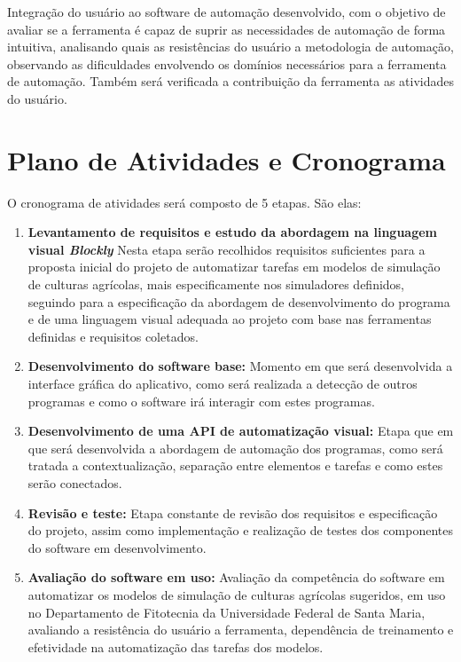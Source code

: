\documentclass[12pt]{article}
\begin{document}
    Integração do usuário ao software de automação desenvolvido, com o objetivo de avaliar se a ferramenta é capaz de suprir as necessidades de automação de forma intuitiva, analisando quais as resistências do usuário a metodologia de automação, observando as dificuldades envolvendo os domínios necessários para a ferramenta de automação. Também será verificada a contribuição da ferramenta as atividades do usuário. 

	\section{Plano de Atividades e Cronograma}
	
	O cronograma de atividades será composto de 5 etapas. São elas:
	
	\begin{enumerate}
		\item \label{activity:requisitos} \textbf{Levantamento de requisitos e estudo da abordagem na linguagem visual \emph{Blockly}}
		Nesta etapa serão recolhidos requisitos suficientes para a proposta inicial do projeto de automatizar tarefas em modelos de simulação de culturas agrícolas, mais especificamente nos simuladores definidos, seguindo para a especificação da abordagem de desenvolvimento do programa e de uma linguagem visual adequada ao projeto com base nas ferramentas definidas e requisitos coletados.
		\item \label{activity:dev1} \textbf{Desenvolvimento do software base:}
		Momento em que será desenvolvida a interface gráfica do aplicativo, como será realizada a detecção de outros programas e como o software irá interagir com estes programas. 
		\item \label{activity:dev2} \textbf{Desenvolvimento de uma API de automatização visual:}
		Etapa que em que será desenvolvida a abordagem de automação dos programas, como será tratada a contextualização, separação entre elementos e tarefas e como estes serão conectados.
		\item \label{activity:revisão} \textbf{Revisão e teste:}
		Etapa constante de revisão dos requisitos e especificação do projeto, assim como implementação e realização de testes dos componentes do software em desenvolvimento.
		\item \label{activity:avaliação} \textbf{Avaliação do software em uso:}
		Avaliação da competência do software em automatizar os modelos de simulação de culturas agrícolas sugeridos, em uso no Departamento de Fitotecnia da Universidade Federal de Santa Maria, avaliando a resistência do usuário a ferramenta, dependência de treinamento e efetividade na automatização das tarefas dos modelos.
	\end{enumerate}
	
\end{document}

